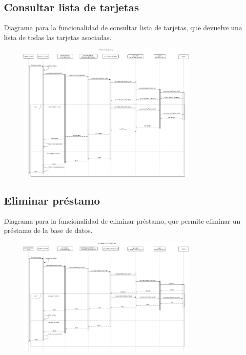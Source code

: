 \documentclass[12pt]{article}
\begin{document}
\subsection{Consultar lista de tarjetas}
Diagrama para la funcionalidad de consultar lista de tarjetas, que devuelve una lista de todas las tarjetas asociadas.
\begin{figure}[H]
    \centering
    \includegraphics[width=0.8\textwidth]{images/consultarListaTarjetas.png}
\end{figure}
\subsection{Eliminar préstamo}
Diagrama para la funcionalidad de eliminar préstamo, que permite eliminar un préstamo de la base de datos.
\begin{figure}[H]
    \centering
    \includegraphics[width=0.8\textwidth]{images/18-eliminarprestamos.png}
\end{figure}
\end{document}
